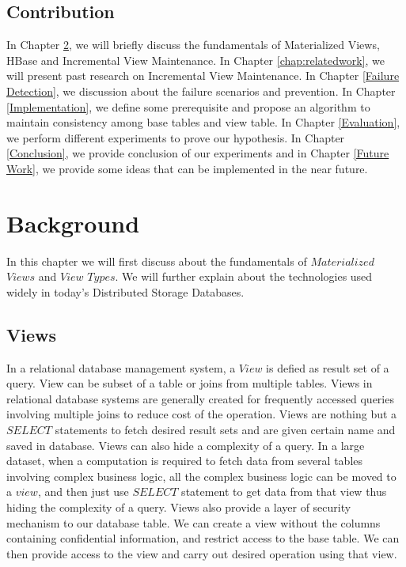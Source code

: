 \documentclass[11pt,a4paper,bibtotoc,idxtotoc,headsepline,footsepline,footexclude,BCOR12mm,DIV13]{scrbook}
\begin{document}
\section{Contribution}
In Chapter \ref{chap:background}, we will briefly discuss the fundamentals of Materialized Views, HBase and Incremental View Maintenance. In Chapter \ref{chap:relatedwork}, we will present past research on Incremental View Maintenance. In Chapter \ref{Failure Detection}, we discussion about the failure scenarios and prevention. In Chapter \ref{Implementation}, we define some prerequisite and propose an algorithm to maintain consistency among base tables and view table. In Chapter \ref{Evaluation}, we perform different experiments to prove our hypothesis. In Chapter \ref{Conclusion}, we provide conclusion of our experiments and in Chapter \ref{Future Work}, we provide some ideas that can be implemented in the near future.


\chapter{Background}
\label{chap:background}

In this chapter we will first discuss about the fundamentals of $Materialized$ $Views$ and $View$ $Types$. We will further explain about the technologies used widely in today's Distributed Storage Databases. 

\section{Views}
In a relational database management system, a $View$ is defied as result set of a query. View can be subset of a table or joins from multiple tables. Views in relational database systems are generally created for frequently accessed queries involving multiple joins to reduce cost of the operation. Views are nothing but a $SELECT$ statements to fetch desired result sets and are given certain name and saved in database. Views can also hide a complexity of a query. In a large dataset, when a computation is required to fetch data from several tables involving complex business logic, all the complex business logic can be moved to a $view$, and then just use $SELECT$ statement to get data from that view thus hiding the complexity of a query. Views also provide a layer of security mechanism to our database table. We can create a view without the columns containing confidential information, and restrict access to the base table. We can then provide access to the view and carry out desired operation using that view. 
\end{document}
